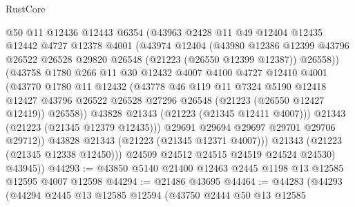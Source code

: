 \begin{lexlean}{RustCore}
\begin{coremodule}
                  @50
                  @11
                  @12436
                  @12443
                  @6354
                  (@43963
                    @2428
                    @11
                    @49
                    @12404
                    @12435
                    @12442
                    @4727
                    @12378
                    @4001
                    (@43974
                      @12404
                      (@43980
                        @12386
                        @12399
                        @43796
                        @26522
                        @26528
                        @29820
                        @26548
                        (@21223 (@26550 @12399 @12387))
                        @26558))
                    (@43758
                      @1780
                      @266
                      @11
                      @30
                      @12432
                      @4007
                      @4100
                      @4727
                      @12410
                      @4001
                      (@43770
                        @1780
                        @11
                        @12432
                        (@43778
                          @46
                          @119
                          @11
                          @7324
                          @5190
                          @12418
                          @12427
                          @43796
                          @26522
                          @26528
                          @27296
                          @26548
                          (@21223 (@26550 @12427 @12419))
                          @26558))
                      @43828
                      @21343
                      (@21223 (@21345 @12411 @4007)))
                    @21343
                    (@21223 (@21345 @12379 @12435)))
                  @29691
                  @29694
                  @29697
                  @29701
                  @29706
                  @29712))
              @43828
              @21343
              (@21223 (@21345 @12371 @4007)))
            @21343
            (@21223 (@21345 @12338 @12450)))
          @24509
          @24512
          @24515
          @24519
          @24524
          @24530)
        @43945))
@44293 := @43850 @5140 @21400 @12463 @2445 @1198 @13 @12585 @12595 @4007 @12598
@44294 := @21486 @43695
@44464 := @44283
    (@44293
      (@44294
        @2445
        @13
        @12585
        @12594
        (@43750
          @2444
          @50
          @13
          @12585

\end{coremodule}
\end{lexlean}
